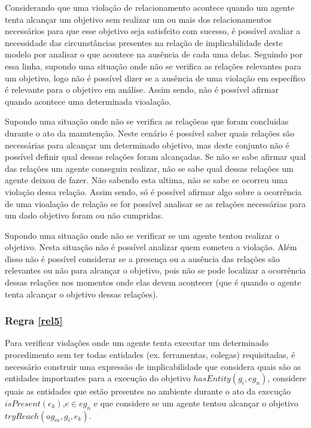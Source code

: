 \documentclass[12pt]{article}
\begin{document}
Considerando que uma violação de relacionamento acontece quando um agente tenta alcançar um objetivo sem realizar um ou mais dos relacionamentos necessários para que esse objetivo seja satisfeito com sucesso, é possível avaliar a necessidade das circunstâncias presentes na relação de implicabilidade deste modelo por analisar o que acontece na ausência de cada uma delas. Seguindo por essa linha, supondo uma situação onde não se verifica as relações relevantes para um objetivo, logo não é possível dizer se a ausência de uma violação em específico é relevante para o objetivo em análise. Assim sendo, não é possível afirmar quando acontece uma determinada vioalação. 

Supondo uma situação onde não se verifica as relaçõeas que foram concluidas durante o ato da manutenção. Neste cenário é possível saber quais relações são necessárias para alcançar um determinado objetivo, mas deste conjunto não é possível definir qual dessas relações foram alcançadas. Se não se sabe afirmar qual das relações um agente conseguiu realizar, não se sabe qual dessas relações um agente deixou de fazer. Não sabendo esta ultima, não se sabe se ocorreu uma violação dessa relação. Assim sendo, só é possível afirmar algo sobre a ocorrência de uma vioalação de relação se for possível analisar se as relações necessárias para um dado objetivo foram ou não cumpridas. 

Supondo uma situação onde não se verificar se um agente tentou realizar o objetivo. Nesta situação não é possível analizar quem cometeu a violação. Além disso não é possível considerar se a presença ou a ausência das relações são relevantes ou não para alcançar o objetivo, pois não se pode localizar a ocorrência dessas relações nos momentos onde elas devem acontecer (que é quando o agente tenta alcançar o objetivo dessas relações). 

\subsubsection{Regra \ref{rel5}}

Para verificar violações onde um agente tenta executar um determinado procedimento sem ter todas entidades (ex. ferramentas, colegas) requisitadas, é necessário construir uma expressão de implicabilidade que considera quais são as entidades importantes para a execução do objetivo $hasEntity(g_i,eg_n)$, considere quais as entidades que estão presentes no ambiente durante o ato da execução $isPresent(e_k)$,$e \in eg_n$ e que considere se um agente tentou alcançar o objetivo $tryReach(ag_m,g_i,e_k)$.
\end{document}
